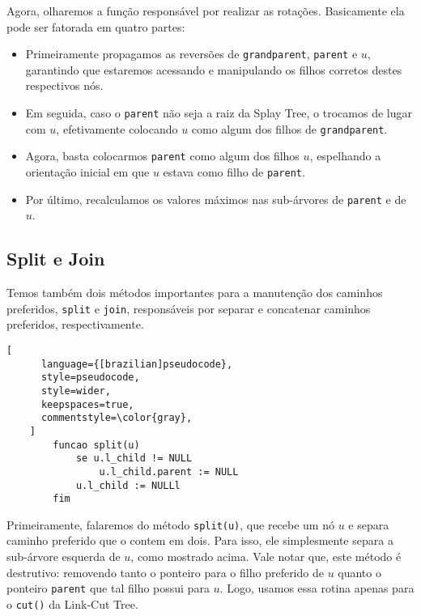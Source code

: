 Agora, olharemos a função responsável por realizar as rotações. Basicamente ela pode ser fatorada em quatro partes:

\begin{itemize}
    \item Primeiramente propagamos as reversões de \texttt{grandparent}, \texttt{parent} e $u$, garantindo que estaremos acessando e manipulando os filhos corretos destes respectivos nós.
    \item Em seguida, caso o \texttt{parent} não seja a raiz da Splay Tree, o trocamos  de lugar com $u$, efetivamente colocando $u$ como algum dos filhos de \texttt{grandparent}.
    \item Agora, basta colocarmos \texttt{parent} como algum dos filhos $u$, espelhando a orientação inicial em que $u$ estava como filho de \texttt{parent}.
    \item Por último, recalculamos os valores máximos nas sub-árvores de \texttt{parent} e de $u$.
\end{itemize}

\subsection{Split e Join}
\label{subsection:lct-splay-split-join}

Temos também dois métodos importantes para a manutenção dos caminhos preferidos, \texttt{split} e \texttt{join}, responsáveis por separar e concatenar caminhos preferidos, respectivamente.

\begin{programruledcaption}{\label{splay:split}}
    \begin{lstlisting}[
      language={[brazilian]pseudocode},
      style=pseudocode,
      style=wider,
      keepspaces=true,
      commentstyle=\color{gray},
    ]
        funcao split(u)
            se u.l_child != NULL
                u.l_child.parent := NULL    
            u.l_child := NULLl
        fim
    \end{lstlisting}
\end{programruledcaption}

Primeiramente, falaremos do método \texttt{split(u)}, que recebe um nó $u$ e separa caminho preferido que o contem em dois. Para isso, ele simplesmente separa a sub-árvore esquerda de $u$, como mostrado acima. Vale notar que, este método é destrutivo: removendo tanto o ponteiro para o filho preferido de $u$ quanto o ponteiro \texttt{parent} que tal filho possui para $u$. Logo, usamos essa rotina apenas para o \texttt{cut()} da Link-Cut Tree.

